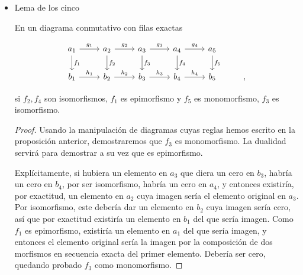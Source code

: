 \documentclass[11pt]{article}
\begin{document}
\begin{itemize}
\begin{itemize}
\begin{proof}
Si factorizamos $f = me$, por exactitud se tendrá $\operatorname{ker} g = m$. Si $g y \equiv 0$,
$y \equiv my'$, y si construimos el producto fibrado

\[\begin{tikzcd}
\cdot\dar[dashed]{y''}\rar[dashed]{e'} & \cdot\dar{y'}\drar[bend left=45]{y} \\
\cdot\rar{e} & \cdot\rar{m} & \cdot &,
\end{tikzcd}\]

como $e'$ es epimorfismo, $y \equiv fy''$.

A la inversa, si para $y \in b$ existe $k = \ker g$, entonces $k \in b$ y $gk \equiv 0$.
Existe entonces $x \in a$ con $fx \equiv k$, es decir, $ku \equiv mexv$. Esto lleva
a $\operatorname{im} f \geq \ker g$ y a $gf = 0$, la exactitud.
\end{proof}

\item Lema de los cinco
\label{sec-7-5-4-6-2}
\begin{theorem}
En un diagrama conmutativo con filas exactas

\[\begin{tikzcd}
a_1 \rar{g_1} \dar{f_1} & 
a_2 \rar{g_2} \dar{f_2} &
a_3 \rar{g_3} \dar{f_3} & 
a_4 \rar{g_4} \dar{f_4} & 
a_5 \dar{f_5} \\
b_1 \rar{h_1} &
b_2 \rar{h_2} &
b_3 \rar{h_3} &
b_4 \rar{h_4} &
b_5 & ,
\end{tikzcd}\]

si $f_2,f_4$ son isomorfismos, $f_1$ es epimorfismo y $f_5$ es monomorfismo, $f_3$ es isomorfismo.
\end{theorem}
\begin{proof}
Usando la manipulación de diagramas cuyas reglas hemos escrito en
la proposición anterior, demostraremos que $f_3$ es monomorfismo.
La dualidad servirá para demostrar a su vez que es epimorfismo.

Explícitamente, si hubiera un elemento en $a_3$ que diera un cero en
$b_3$, habría un cero en $b_4$, por ser isomorfismo, habría un cero en
$a_4$, y entonces existiría, por exactitud, un elemento en $a_2$ cuya
imagen sería el elemento original en $a_3$. Por isomorfismo, este
debería dar un elemento en $b_2$ cuya imagen sería cero, así que
por exactitud existiría un elemento en $b_1$ del que sería imagen.
Como $f_1$ es epimorfismo, existiría un elemento en $a_1$ del que
sería imagen, y entonces el elemento original sería la imagen
por la composición de dos morfismos en secuencia exacta del
primer elemento. Debería ser cero, quedando probado $f_3$ como
monomorfismo.
\end{proof}


\end{itemize}
\end{itemize}
\end{document}
